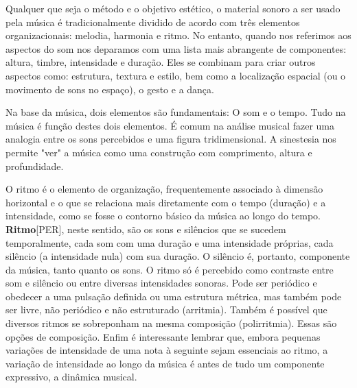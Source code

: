 \documentclass[a4paper,12pt]{article}
\begin{document}
Qualquer que seja o método e o objetivo estético, o material sonoro a ser usado pela música é tradicionalmente dividido de acordo com três elementos organizacionais: melodia, harmonia e ritmo. No entanto, quando nos referimos aos aspectos do som nos deparamos com uma lista mais abrangente de componentes: altura, timbre, intensidade e duração. Eles se combinam para criar outros aspectos como: estrutura, textura e estilo, bem como a localização espacial (ou o movimento de sons no espaço), o gesto e a dança.

Na base da música, dois elementos são fundamentais: O som e o tempo. Tudo na música é função destes dois elementos. É comum na análise musical fazer uma analogia entre os sons percebidos e uma figura tridimensional. A sinestesia nos permite "ver" a música como uma construção com comprimento, altura e profundidade.

O ritmo é o elemento de organização, frequentemente associado à dimensão horizontal e o que se relaciona mais diretamente com o tempo (duração) e a intensidade, como se fosse o contorno básico da música ao longo do tempo. \textbf{Ritmo}\textsc{[PER]}, neste sentido, são os sons e silêncios que se sucedem temporalmente, cada som com uma duração e uma intensidade próprias, cada silêncio (a intensidade nula) com sua duração. O silêncio é, portanto, componente da música, tanto quanto os sons. O ritmo só é percebido como contraste entre som e silêncio ou entre diversas intensidades sonoras. Pode ser periódico e obedecer a uma pulsação definida ou uma estrutura métrica, mas também pode ser livre, não periódico e não estruturado (arritmia). Também é possível que diversos ritmos se sobreponham na mesma composição (polirritmia). Essas são opções de composição. Enfim é interessante lembrar que, embora pequenas variações de intensidade de uma nota à seguinte sejam essenciais ao ritmo, a variação de intensidade ao longo da música é antes de tudo um componente expressivo, a dinâmica musical.
\end{document}
